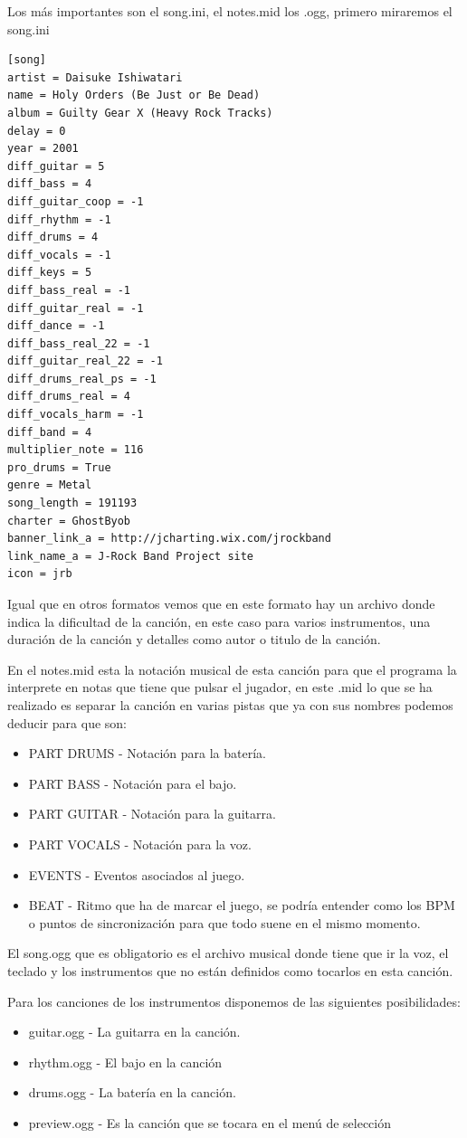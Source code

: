 \documentclass[a4paper,11pt,oneside]{book}
\begin{document}
Los más importantes son el song.ini, el notes.mid los .ogg, primero miraremos el song.ini

\begin{Verbatim}[frame=single]
[song]
artist = Daisuke Ishiwatari
name = Holy Orders (Be Just or Be Dead)
album = Guilty Gear X (Heavy Rock Tracks)
delay = 0
year = 2001
diff_guitar = 5
diff_bass = 4
diff_guitar_coop = -1
diff_rhythm = -1
diff_drums = 4
diff_vocals = -1
diff_keys = 5
diff_bass_real = -1
diff_guitar_real = -1
diff_dance = -1
diff_bass_real_22 = -1
diff_guitar_real_22 = -1
diff_drums_real_ps = -1
diff_drums_real = 4
diff_vocals_harm = -1
diff_band = 4
multiplier_note = 116
pro_drums = True
genre = Metal
song_length = 191193
charter = GhostByob
banner_link_a = http://jcharting.wix.com/jrockband
link_name_a = J-Rock Band Project site
icon = jrb
\end{Verbatim}

Igual que en otros formatos vemos que en este formato hay un archivo donde indica la dificultad de la canción, en este caso para varios instrumentos, una duración de la canción y detalles como autor o titulo de la canción.

En el notes.mid esta la notación musical de esta canción  para que el programa la interprete en notas que tiene que pulsar el jugador, en este .mid lo que se ha realizado es separar la canción en varias pistas que ya con sus nombres podemos deducir para que son:

\begin{itemize}
\item PART DRUMS - Notación para la batería.
\item PART BASS - Notación para el bajo.
\item PART GUITAR - Notación para la guitarra.
\item PART VOCALS - Notación para la voz.
\item EVENTS - Eventos asociados al juego.
\item BEAT - Ritmo que ha de marcar el juego, se podría entender como los BPM o puntos de sincronización para que todo suene en el mismo momento.
\end{itemize}


El song.ogg que es obligatorio es el archivo musical donde tiene que ir la voz, el teclado y los instrumentos que no están definidos como tocarlos en esta canción.

Para los canciones de los instrumentos disponemos de las siguientes posibilidades:

\begin{itemize}
\item guitar.ogg - La guitarra en la canción.
\item rhythm.ogg - El bajo en la canción
\item drums.ogg - La batería en la canción.
\item preview.ogg - Es la canción que se tocara en el menú de selección
\end{itemize}
\end{document}
